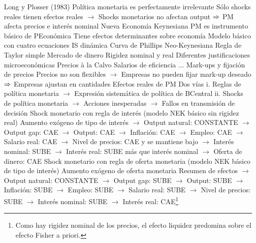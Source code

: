 \documentclass{nuevotema}
\begin{document}
\begin{esquemal}
				\4[] Long y Plosser (1983)
				\4[] Política monetaria es perfectamente irrelevante
				\4[] Sólo shocks reales tienen efectos reales
				\4[] $\to$ Shocks monetarios no afectan output
				\4[] $\Rightarrow$ PM afecta precios e interés nominal
			\3 Nueva Economía Keynesiana
				\4 PM es instrumento básico de PEconómica
				\4[] Tiene efectos determinantes sobre economía
				\4 Modelo básico con cuatro ecuaciones
				\4[DIS] IS dinámica
				\4[] 
				\4[NKPC] Curva de Phillips Neo-Keynesiana
				\4[] 
				\4[TR] Regla de Taylor simple
				\4[] 
				\4[MP] Mercado de dinero
				\4[] 
				\4 Rigidez nominal y real
				\4[] Diferentes justificaciones microeconómicas
				\4[] Precios à la Calvo
				\4[] Salarios de eficiencia
				\4[] ...
				\4 Mark-ups y fijación de precios
				\4[] Precios no son flexibles
				\4[] $\to$ Empresas no pueden fijar mark-up deseado
				\4[] $\Rightarrow$ Empresas ajustan en cantidades
				\4 Efectos reales de PM
				\4[] Dos vías
				\4[] i. Reglas de política monetaria
				\4[] $\to$ Expresión sistemática de política de BCentral
				\4[] ii. Shocks de política monetaria
				\4[] $\to$ Acciones inesperadas
				\4[] $\to$ Fallos en transmisión de decisión
				\4 Shock monetario con regla de interés
				\4[] (modelo NEK básico sin rigidez real)
				\4[] Aumento exógeno de tipo de interés
				\4[] $\to$ Output natural: CONSTANTE
				\4[] $\to$ Output gap: CAE
				\4[] $\to$ Output: CAE
				\4[] $\to$ Inflación: CAE
				\4[] $\to$ Empleo: CAE
				\4[] $\to$ Salario real: CAE
				\4[] $\to$ Nivel de precios: CAE y se mantiene bajo
				\4[] $\to$ Interés nominal: SUBE
				\4[] $\to$ Interés real: SUBE más que interés nominal
				\4[] $\to$ Oferta de dinero: CAE
				\4 Shock monetario con regla de oferta monetaria
				\4[] (modelo NEK básico de tipo de interés)
				\4[] Aumento exógeno de oferta monetaria
				\4[] Resumen de efectos
				\4[] $\to$ Output natural: CONSTANTE
				\4[] $\to$ Output gap: SUBE
				\4[] $\to$ Output: SUBE
				\4[] $\to$ Inflación: SUBE
				\4[] $\to$ Empleo: SUBE
				\4[] $\to$ Salario real: SUBE
				\4[] $\to$ Nivel de precios: SUBE
				\4[] $\to$ Interés nominal: SUBE
				\4[] $\to$ Interés real: CAE\footnote{Como hay rigidez nominal de los precios, el efecto liquidez predomina sobre el efecto Fisher a priori.}

\end{esquemal}
\end{document}
